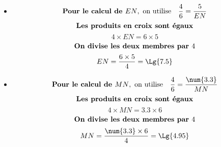     \begin{multicols}{2}
        \begin{itemize}
        \item \phantom{rrr}

        {\color{red}
        $$\mbox{\bf Pour le calcul de $EN$}, \mbox{ on utilise} \quad \dfrac{4}{6}=\dfrac{5}{EN}$$
        $$\mbox{\bf Les produits en croix sont égaux}$$
        $$4\times EN=6\times 5$$
        $$\mbox{\bf On divise les deux membres par $4$}$$
        $$EN=\frac{6\times 5}{4}=\Lg{7.5}$$
        }
        \columnbreak
        \item \phantom{rrr}

        {\color{red}
        $$\mbox{\bf Pour le calcul de $MN$}, \mbox{ on utilise} \quad \dfrac{4}{6}=\dfrac{\num{3.3}}{MN}$$
        $$\mbox{\bf Les produits en croix sont égaux}$$
        $$4\times MN=\num{3.3}\times 6$$
        $$\mbox{\bf On divise les deux membres par $4$}$$
        $$MN=\frac{\num{3.3}\times 6}{4}=\Lg{4.95}$$
        }
        \end{itemize}
    \end{multicols}

